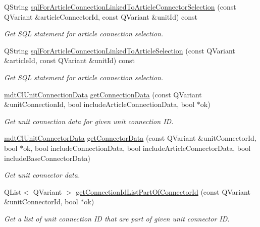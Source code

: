 \begin{DoxyCompactItemize}
Q\-String \hyperlink{classmdt_cl_unit_adc3fcf6f85c715dd31700186ac775e24}{sql\-For\-Article\-Connection\-Linked\-To\-Article\-Connector\-Selection} (const Q\-Variant \&article\-Connector\-Id, const Q\-Variant \&unit\-Id) const 
\begin{DoxyCompactList}\small\item\em Get S\-Q\-L statement for article connection selection. \end{DoxyCompactList}\item 
Q\-String \hyperlink{classmdt_cl_unit_a35befd3bf556fc29f0d3d1e1aa9a69cf}{sql\-For\-Article\-Connection\-Linked\-To\-Article\-Selection} (const Q\-Variant \&article\-Id, const Q\-Variant \&unit\-Id) const 
\begin{DoxyCompactList}\small\item\em Get S\-Q\-L statement for article connection selection. \end{DoxyCompactList}\item 
\hyperlink{classmdt_cl_unit_connection_data}{mdt\-Cl\-Unit\-Connection\-Data} \hyperlink{classmdt_cl_unit_a73c87dcbb0f21a16849e5c04d35753aa}{get\-Connection\-Data} (const Q\-Variant \&unit\-Connection\-Id, bool include\-Article\-Connection\-Data, bool $\ast$ok)
\begin{DoxyCompactList}\small\item\em Get unit connection data for given unit connection I\-D. \end{DoxyCompactList}\item 
\hyperlink{classmdt_cl_unit_connector_data}{mdt\-Cl\-Unit\-Connector\-Data} \hyperlink{classmdt_cl_unit_ae0992fd5a8807953ee882487c3aaa4b0}{get\-Connector\-Data} (const Q\-Variant \&unit\-Connector\-Id, bool $\ast$ok, bool include\-Connection\-Data, bool include\-Article\-Connector\-Data, bool include\-Base\-Connector\-Data)
\begin{DoxyCompactList}\small\item\em Get unit connector data. \end{DoxyCompactList}\item 
Q\-List$<$ Q\-Variant $>$ \hyperlink{classmdt_cl_unit_acaefd010c898e3091784434a7f731aaa}{get\-Connection\-Id\-List\-Part\-Of\-Connector\-Id} (const Q\-Variant \&unit\-Connector\-Id, bool $\ast$ok)
\begin{DoxyCompactList}\small\item\em Get a list of unit connection I\-D that are part of given unit connector I\-D. \end{DoxyCompactList}\item 

\end{DoxyCompactItemize}
